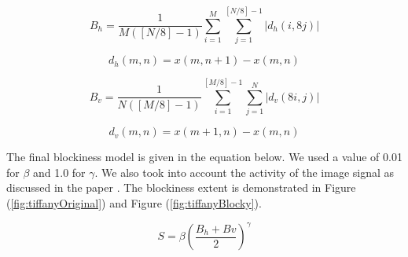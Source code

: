 \begin{equation}
B_{h}=\frac{1}{M([N/8]-1)} \sum_{i=1}^{M} \sum_{j=1}^{[N/8]-1} |d_{h}(i,8j)|
\end{equation}

\begin{equation}
d_{h}(m,n)=x(m,n+1)-x(m,n)
\end{equation}

\begin{equation}
B_{v}=\frac{1}{N([M/8]-1)} \sum_{i=1}^{[M/8]-1} \sum_{j=1}^{N} |d_{v}(8i,j)|
\end{equation}

\begin{equation}
d_{v}(m,n)=x(m+1,n)-x(m,n)
\end{equation}

\noindent The final blockiness model is given in the equation below.  We used a value of 0.01 for $\beta$ and 1.0 for $\gamma$.
We also took into account the activity of the image signal as discussed in the paper \cite{Wang}.
The blockiness extent is demonstrated in Figure (\ref{fig:tiffanyOriginal}) and Figure (\ref{fig:tiffanyBlocky}).

\begin{equation}
S=\beta \left(\frac{B_{h}+B{v}}{2}\right)^\gamma
\end{equation}
















